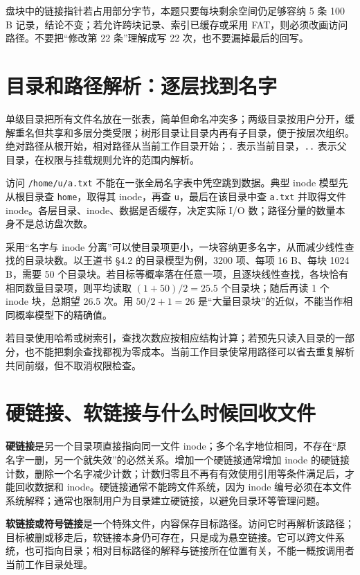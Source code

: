盘块中的链接指针若占用部分字节，本题只要每块剩余空间仍足够容纳 5 条 100 B 记录，结论不变；若允许跨块记录、索引已缓存或采用 FAT，则必须改画访问路径。不要把``修改第 22 条''理解成写 22 次，也不要漏掉最后的回写。

\section{目录和路径解析：逐层找到名字}\label{os-6-6}

单级目录把所有文件名放在一张表，简单但命名冲突多；两级目录按用户分开，缓解重名但共享和多层分类受限；树形目录让目录内再有子目录，便于按层次组织。绝对路径从根开始，相对路径从当前工作目录开始；\allowbreak{}\texttt{.} 表示当前目录，\allowbreak{}\texttt{..} 表示父目录，在权限与挂载规则允许的范围内解析。

访问 \allowbreak{}\texttt{/home/u/a.txt} 不能在一张全局名字表中凭空跳到数据。典型 inode 模型先从根目录查 \allowbreak{}\texttt{home}，取得其 inode，再查 \allowbreak{}\texttt{u}，最后在该目录中查 \allowbreak{}\texttt{a.txt} 并取得文件 inode。各层目录、inode、数据是否缓存，决定实际 I/O 数；路径分量的数量本身不是总访盘次数。

采用``名字与 inode 分离''可以使目录项更小，一块容纳更多名字，从而减少线性查找的目录块数。以王道书 §4.2 的目录模型为例，3200 项、每项 16 B、每块 1024 B，需要 50 个目录块。若目标等概率落在任意一项，且逐块线性查找，各块恰有相同数量目录项，则平均读取 \((1+50)/2=25.5\) 个目录块；随后再读 1 个 inode 块，总期望 26.5 次。用 \(50/2+1=26\) 是``大量目录块''的近似，不能当作相同概率模型下的精确值。

若目录使用哈希或树索引，查找次数应按相应结构计算；若预先只读入目录的一部分，也不能把剩余查找都视为零成本。当前工作目录使常用路径可以省去重复解析共同前缀，但不取消权限检查。

\section{硬链接、软链接与什么时候回收文件}\label{os-6-7}

\textbf{硬链接}是另一个目录项直接指向同一文件 inode；多个名字地位相同，不存在``原名字一删，另一个就失效''的必然关系。增加一个硬链接通常增加 inode 的硬链接计数，删除一个名字减少计数；计数归零且不再有有效使用引用等条件满足后，才能回收数据和 inode。硬链接通常不能跨文件系统，因为 inode 编号必须在本文件系统解释；通常也限制用户为目录建立硬链接，以避免目录环等管理问题。

\textbf{软链接或符号链接}是一个特殊文件，内容保存目标路径。访问它时再解析该路径；目标被删或移走后，软链接本身仍可存在，只是成为悬空链接。它可以跨文件系统，也可指向目录；相对目标路径的解释与链接所在位置有关，不能一概按调用者当前工作目录处理。

